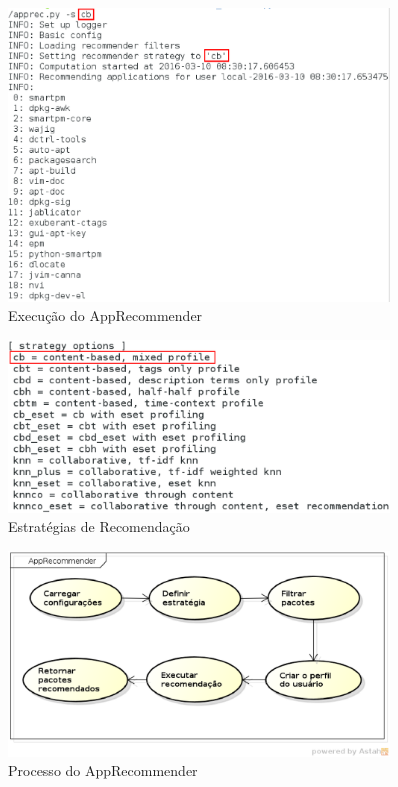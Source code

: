 \begin{frame}
\begin{figure}[h]
  \centering
  \includegraphics[width=0.9\textwidth]{figura/execucao_apprecommender.eps}
  \caption{Execução do AppRecommender}
  \label{fig:execucao_apprecommender}
\end{figure}
\end{frame}

\begin{frame}
\begin{figure}[h]
  \centering
  \includegraphics[width=0.9\textwidth]{figura/apprecommender_estrategias.eps}
  \caption{Estratégias de Recomendação}
  \label{fig:apprecommender_estrategias}
\end{figure}
\end{frame}

\begin{frame}
\begin{figure}[h]
  \centering
  \includegraphics[width=0.9\textwidth]{figura/app_recommender_process.eps}
  \caption{Processo do AppRecommender}
  \label{fig:curva_aprendizado}
\end{figure}
\end{frame}

